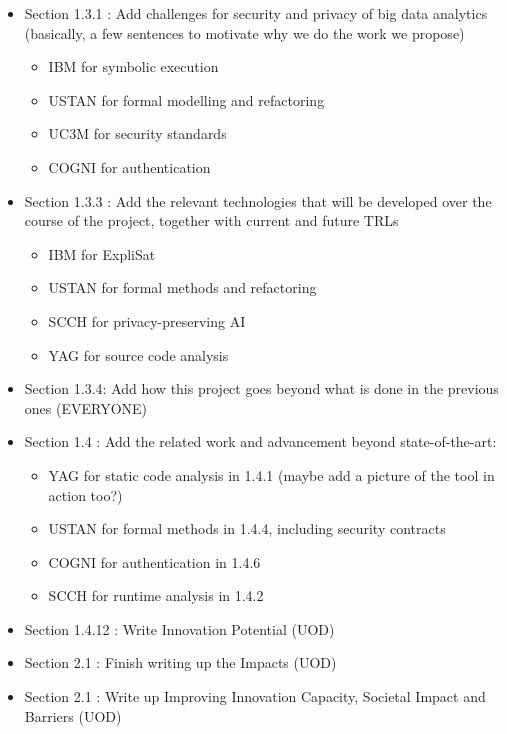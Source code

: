 \documentclass[a4paper,11pt]{article}
\begin{document}
\begin{itemize}

\item Section 1.3.1 : Add challenges for security and privacy of big data analytics (basically, a few sentences to motivate why we do the work we propose)

\begin{itemize}
\item IBM for symbolic execution
\item USTAN for formal modelling and refactoring
\item UC3M for security standards
\item COGNI for authentication
\end{itemize}

\item Section 1.3.3 : Add the relevant technologies that will be developed over the course of the project, together with current and future TRLs
\begin{itemize}
\item IBM for ExpliSat
\item USTAN for formal methods and refactoring
\item SCCH for privacy-preserving AI
\item YAG for source code analysis
\end{itemize}

\item Section 1.3.4: Add how this project goes beyond what is done in the previous ones (EVERYONE)

\item Section 1.4 : Add the related work and advancement beyond state-of-the-art:
\begin{itemize}
\item YAG for static code analysis in 1.4.1 (maybe add a picture of the tool in action too?)
\item USTAN for formal methods in 1.4.4, including security contracts
\item COGNI for authentication in 1.4.6
\item SCCH for runtime analysis in 1.4.2
\end{itemize}

	
\item Section 1.4.12 : Write Innovation Potential (UOD)

\item Section 2.1 : Finish writing up the Impacts (UOD)

\item Section 2.1 : Write up Improving Innovation Capacity, Societal Impact and Barriers (UOD)


\end{itemize}
\end{document}
